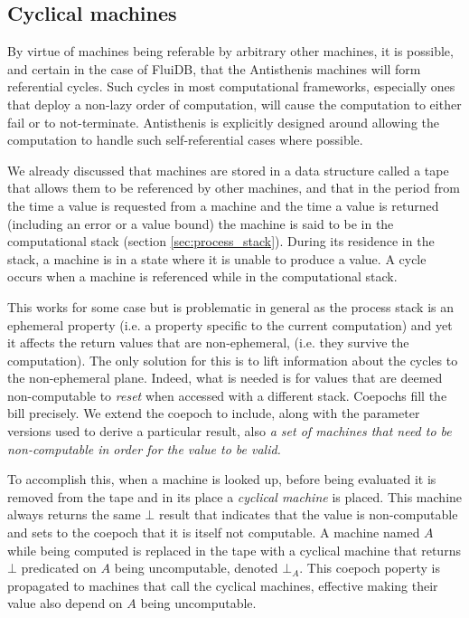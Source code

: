 \subsection{Cyclical machines}
\label{sec:cyclical_machines}

By virtue of machines being referable by arbitrary other machines, it
is possible, and certain in the case of FluiDB, that the Antisthenis
machines will form referential cycles. Such cycles in most
computational frameworks, especially ones that deploy a non-lazy order
of computation, will cause the computation to either fail or to
not-terminate. Antisthenis is explicitly designed around allowing the
computation to handle such self-referential cases where possible.

We already discussed that machines are stored in a
data structure called a tape that allows them to be referenced by
other machines, and that in the period from the time a value is
requested from a machine and the time a value is returned (including an
error or a value bound) the machine is said to be in the computational
stack (section \ref{sec:process_stack}). During its
residence in the stack, a machine is in a state where it is unable to
produce a value. A cycle occurs when a machine is referenced while in
the computational stack.

This works for some case but is problematic in general as the process
stack is an ephemeral property (i.e. a property specific to the
current computation) and yet it affects the return values that are
non-ephemeral, (i.e. they survive the computation).  The only solution
for this is to lift information about the cycles to the non-ephemeral
plane. Indeed, what is needed is for values that are deemed
non-computable to \emph{reset} when accessed with a different
stack. Coepochs fill the bill precisely. We extend the coepoch to
include, along with the parameter versions used to derive a particular
result, also \emph{a set of machines that need to be non-computable in
  order for the value to be valid.}

To accomplish this, when a machine is looked up, before being
evaluated it is removed from the tape and in its place a
\emph{cyclical machine} is placed. This machine always returns the
same \(\bot\) result that indicates that the value is non-computable
and sets to the coepoch that it is itself not computable. A machine
named \(A\) while being computed is replaced in the tape with a
cyclical machine that returns \(\bot\) predicated on \(A\) being
uncomputable, denoted \(\bot_A\). This coepoch poperty is propagated
to machines that call the cyclical machines, effective making their
value also depend on \(A\) being uncomputable.


